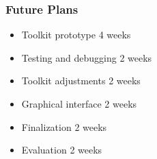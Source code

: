 

\begin{frame}
  \frametitle{Future Plans}
  \centering
      \begin{itemize}
        \item Toolkit prototype \hspace{50pt} 4 weeks
        \item Testing and debugging \hspace{18pt} 2 weeks
        \item Toolkit adjustments \hspace{40pt} 2 weeks
        \item Graphical interface \hspace{35pt} 2 weeks
        \item Finalization \hspace{77pt} 2 weeks
        \item Evaluation \hspace{80pt} 2 weeks
      \end{itemize}
\end{frame}




